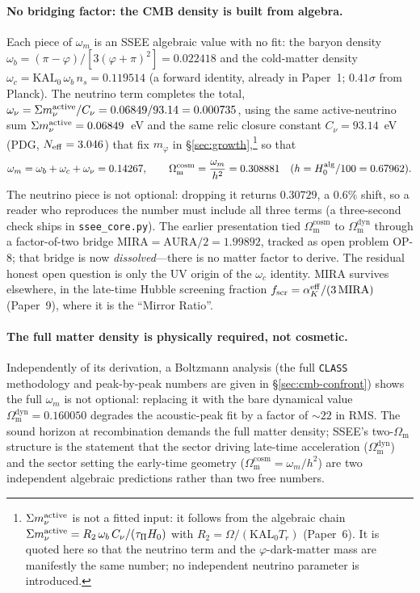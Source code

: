 \documentclass[a4paper,11pt]{article}
\newcommand{\Om}{\Omega_{\mathrm{m}}}
\begin{document}
\paragraph{No bridging factor: the CMB density is built from algebra.} Each
piece of $\omega_m$ is an SSEE algebraic value with no fit: the baryon density
$\omega_b=(\pi-\varphi)/[3(\varphi+\pi)^2]=0.022418$ and the cold-matter density
$\omega_c=\mathrm{KAL_0}\,\omega_b\,n_s=0.119514$ (a forward identity, already in
Paper~1; $0.41\sigma$ from Planck). The neutrino term completes the total,
$\omega_\nu=\Sigma m_\nu^{\rm active}/C_\nu=0.06849/93.14=0.000735$, using the
same active-neutrino sum $\Sigma m_\nu^{\rm active}=0.06849$~eV and the same
relic closure constant $C_\nu=93.14$~eV (PDG, $N_{\rm eff}=3.046$) that fix
$m_\varphi$ in \S\ref{sec:growth},\footnote{$\Sigma m_\nu^{\rm active}$ is not
a fitted input: it follows from the algebraic chain
$\Sigma m_\nu^{\rm active}=R_2\,\omega_b\,C_\nu/(\tau_\Pi H_0)$ with
$R_2=\Omega/(\mathrm{KAL_0}T_r)$ (Paper~6). It is quoted here so that the
neutrino term and the $\varphi$-dark-matter mass are manifestly the same
number; no independent neutrino parameter is introduced.} so that
\begin{equation}
  \omega_m=\omega_b+\omega_c+\omega_\nu=0.14267,
  \qquad
  \Om^{\mathrm{cosm}}=\frac{\omega_m}{h^2}=0.308881
  \quad (h=H_0^{\rm alg}/100=0.67962).
  \label{eq:omcosm_breakdown}
\end{equation}
The neutrino piece is not optional: dropping it returns $0.30729$, a $0.6\%$
shift, so a reader who reproduces the number must include all three terms
(a three-second check ships in \texttt{ssee\_core.py}). The earlier presentation tied
$\Om^{\mathrm{cosm}}$ to $\Om^{\mathrm{dyn}}$ through a factor-of-two bridge
$\mathrm{MIRA}=\mathrm{AURA}/2=1.99892$, tracked as open problem OP-8; that
bridge is now \emph{dissolved}---there is no matter factor to derive. The
residual honest open question is only the UV origin of the $\omega_c$ identity.
$\mathrm{MIRA}$ survives elsewhere, in the late-time Hubble screening fraction
$f_{\rm scr}=\alpha_K^{\rm eff}/(3\,\mathrm{MIRA})$ (Paper~9), where it is the ``Mirror Ratio''.

\paragraph{The full matter density is physically required, not cosmetic.}
Independently of its derivation, a Boltzmann analysis (the full \texttt{CLASS}
methodology and peak-by-peak numbers are given in
\S\ref{sec:cmb-confront}) shows the full $\omega_m$ is not optional: replacing
it with the bare dynamical value $\Om^{\mathrm{dyn}}=0.160050$ degrades the
acoustic-peak fit by a factor of $\sim22$ in RMS. The sound horizon at
recombination demands the full matter density; SSEE's two-$\Om$ structure is
the statement that the sector driving late-time acceleration
($\Om^{\mathrm{dyn}}$) and the sector setting the early-time geometry
($\Om^{\mathrm{cosm}}=\omega_m/h^2$) are two independent algebraic
predictions rather than two free numbers.
\end{document}
